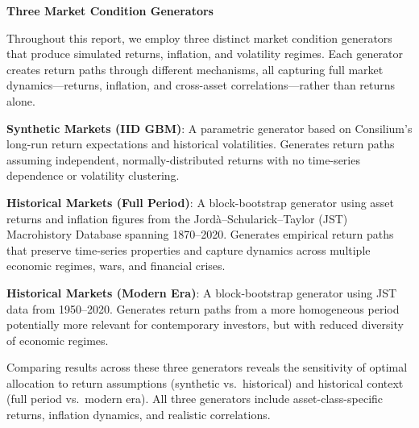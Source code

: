 \documentclass[11pt]{article}
\newcommand{\asideboxtitle}[1]{\noindent\textbf{\large #1}\par\vspace{0.5em}}
\begin{document}
\begin{asidebox}
  \asideboxtitle{Three Market Condition Generators}
  
  Throughout this report, we employ three distinct market condition generators that produce simulated returns, inflation, and volatility regimes. Each generator creates return paths through different mechanisms, all capturing full market dynamics---returns, inflation, and cross-asset correlations---rather than returns alone.
  
  \textbf{Synthetic Markets (IID GBM)}: A parametric generator based on Consilium's long-run return expectations and historical volatilities. Generates return paths assuming independent, normally-distributed returns with no time-series dependence or volatility clustering.
  
  \textbf{Historical Markets (Full Period)}: A block-bootstrap generator using asset returns and inflation figures from the Jord\`a--Schularick--Taylor (JST) Macrohistory Database spanning 1870--2020. Generates empirical return paths that preserve time-series properties and capture dynamics across multiple economic regimes, wars, and financial crises.
  
  \textbf{Historical Markets (Modern Era)}: A block-bootstrap generator using JST data from 1950--2020. Generates return paths from a more homogeneous period potentially more relevant for contemporary investors, but with reduced diversity of economic regimes.
  
  Comparing results across these three generators reveals the sensitivity of optimal allocation to return assumptions (synthetic vs.\ historical) and historical context (full period vs.\ modern era). All three generators include asset-class-specific returns, inflation dynamics, and realistic correlations.
\end{asidebox} 
\end{document}
